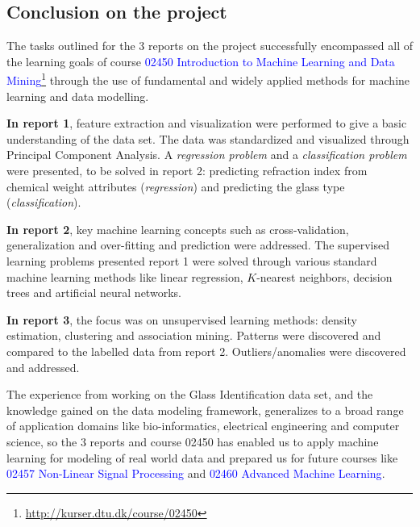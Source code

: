 \subsection{Conclusion on the project}
The tasks outlined for the 3 reports on the project successfully encompassed all of the learning goals of course \textcolor{blue}{02450 Introduction to Machine Learning and Data Mining}\footnote{\url{http://kurser.dtu.dk/course/02450}} through the use of fundamental and widely applied methods for machine learning and data modelling.

\textbf{In report 1}, feature extraction and visualization were performed to give a basic understanding of the data set. The data was standardized and visualized through Principal Component Analysis. A \textcolor{Bittersweet}{\textit{regression problem}} and a \textcolor{Bittersweet}{\textit{classification problem}} were presented, to be solved in report 2: predicting refraction index from chemical weight attributes (\textcolor{Bittersweet}{\textit{regression}}) and predicting the glass type (\textcolor{Bittersweet}{\textit{classification}}).

\textbf{In report 2}, key machine learning concepts such as cross-validation, generalization and over-fitting and prediction were addressed. The supervised learning problems presented report 1 were solved through various standard machine learning methods like linear regression, $K$-nearest neighbors, decision trees and artificial neural networks.

\textbf{In report 3}, the focus was on unsupervised learning methods: density estimation, clustering and association mining. Patterns were discovered and compared to the labelled data from report 2. Outliers/anomalies were discovered and addressed.

The experience from working on the Glass Identification data set, and the knowledge gained on the data modeling framework, generalizes to a broad range of application domains like bio-informatics, electrical engineering and computer science, so the 3 reports and course 02450 has enabled us to apply machine learning for modeling of real world data and prepared us for future courses like \textcolor{blue}{02457 Non-Linear Signal Processing} and \textcolor{blue}{02460 Advanced Machine Learning}.


